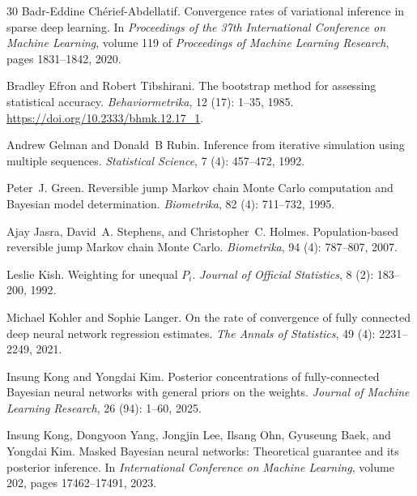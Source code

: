 \documentclass[11pt,a4paper]{article}
\theoremstyle{remark}
\begin{document}
\begin{thebibliography}{30}
Badr-Eddine Ch{\'e}rief-Abdellatif.
\newblock Convergence rates of variational inference in sparse deep learning.
\newblock In \emph{Proceedings of the 37th International Conference on Machine
  Learning}, volume 119 of \emph{Proceedings of Machine Learning Research},
  pages 1831--1842, 2020.

Bradley Efron and Robert Tibshirani.
\newblock The bootstrap method for assessing statistical accuracy.
\newblock \emph{Behaviormetrika}, 12 (17): 1--35, 1985.
\newblock \url{https://doi.org/10.2333/bhmk.12.17_1}.

Andrew Gelman and Donald~B Rubin.
\newblock Inference from iterative simulation using multiple sequences.
\newblock \emph{Statistical Science}, 7 (4): 457--472, 1992.

Peter~J. Green.
\newblock Reversible jump {Markov} chain {Monte Carlo} computation and
  {Bayesian} model determination.
\newblock \emph{Biometrika}, 82 (4): 711--732, 1995.

Ajay Jasra, David~A. Stephens, and Christopher~C. Holmes.
\newblock Population-based reversible jump {Markov} chain {Monte Carlo}.
\newblock \emph{Biometrika}, 94 (4): 787--807, 2007.

Leslie Kish.
\newblock Weighting for unequal $P_i$.
\newblock \emph{Journal of Official Statistics}, 8 (2):
  183--200, 1992.

Michael Kohler and Sophie Langer.
\newblock On the rate of convergence of fully connected deep neural network
  regression estimates.
\newblock \emph{The Annals of Statistics}, 49 (4):
  2231--2249, 2021.

Insung Kong and Yongdai Kim.
\newblock Posterior concentrations of fully-connected {B}ayesian neural
  networks with general priors on the weights.
\newblock \emph{Journal of Machine Learning Research}, 26
  (94): 1--60, 2025.

Insung Kong, Dongyoon Yang, Jongjin Lee, Ilsang Ohn, Gyuseung Baek, and Yongdai
  Kim.
\newblock Masked {B}ayesian neural networks: Theoretical guarantee and its
  posterior inference.
\newblock In \emph{International Conference on Machine Learning}, volume 202,
  pages 17462--17491, 2023.


\end{thebibliography}
\end{document}
